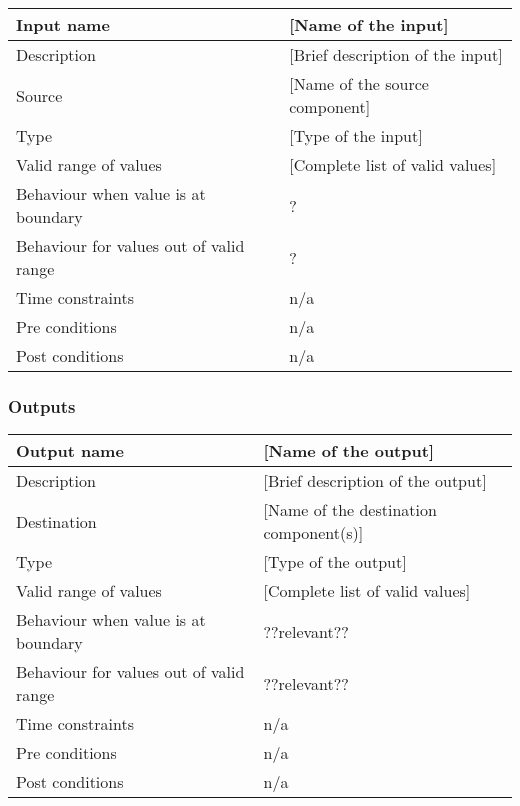 \begin{longtable}{p{}p{}}
\toprule
Input name				& [Name of the input] \\
\midrule
Description				& [Brief description of the input] \\
\midrule
Source					& [Name of the source component] \\ 
\midrule
Type					& [Type of the input] \\
\midrule
Valid range of values	& [Complete list of valid values] \\
\midrule
Behaviour when value is at boundary	& ? \\
\midrule
Behaviour for values out of valid range	& ? \\
\midrule
Time constraints		& n/a \\
\midrule
Pre conditions 			& n/a \\
\midrule
Post conditions 		& n/a \\
\bottomrule
\end{longtable}


\subsubsection{Outputs}

\begin{longtable}{p{}p{}}
\toprule
Output name				& [Name of the output] \\
\midrule
Description				& [Brief description of the output] \\
\midrule
Destination				& [Name of the destination component(s)] \\ 
\midrule
Type					& [Type of the output] \\
\midrule
Valid range of values	& [Complete list of valid values] \\
\midrule
Behaviour when value is at boundary	& ??relevant?? \\
\midrule
Behaviour for values out of valid range	& ??relevant?? \\
\midrule
Time constraints		& n/a \\
\midrule
Pre conditions 			& n/a \\
\midrule
Post conditions 		& n/a \\
\bottomrule
\end{longtable}
